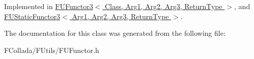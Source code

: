 Implemented in \hyperlink{classFUFunctor3_a7b253fc6a8983af28bbc852c8b07c63f}{FUFunctor3$<$ Class, Arg1, Arg2, Arg3, ReturnType $>$}, and \hyperlink{classFUStaticFunctor3_a9dfd76b69ced5dc97981b85b1741aaf7}{FUStaticFunctor3$<$ Arg1, Arg2, Arg3, ReturnType $>$}.



The documentation for this class was generated from the following file:\begin{DoxyCompactItemize}
\item 
FCollada/FUtils/FUFunctor.h\end{DoxyCompactItemize}
